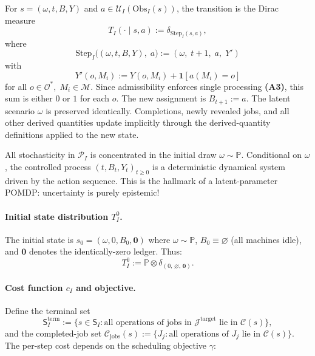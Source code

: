 For $s = (\omega, t, B, Y)$ and $a \in \mathcal{U}_I(\mathrm{Obs}_I(s))$, the transition
is the Dirac measure
\[
T_I(\cdot \mid s, a) := \delta_{\mathrm{Step}_I(s, a)},
\]
where
\[
\mathrm{Step}_I\bigl((\omega, t, B, Y),\; a\bigr) := (\omega,\; t+1,\; a,\; Y')
\]
with
\[
Y'(o, M_i) := Y(o, M_i) + \mathbf{1}[a(M_i) = o]
\]
for all $o \in \mathcal{O}^*,\; M_i \in \mathcal{M}$. Since admissibility enforces single
processing \textbf{(A3)}, this sum is either $0$ or $1$ for each $o$. The new assignment
is $B_{t+1} := a$. The latent scenario $\omega$ is preserved identically. Completions,
newly revealed jobs, and all other derived quantities update implicitly through the
derived-quantity definitions applied to the new state.

\begin{remark}
All stochasticity in $\mathcal{P}_I$ is concentrated in the initial draw
$\omega \sim \mathbb{P}$. Conditional on $\omega$, the controlled process
$(t, B_t, Y_t)_{t \ge 0}$ is a deterministic dynamical system driven by the action
sequence. This is the hallmark of a latent-parameter POMDP: uncertainty is purely
epistemic!
\end{remark}

\paragraph{Initial state distribution $T_I^0$.}

The initial state is $s_0 = (\omega, 0, B_0, \mathbf{0})$ where
$\omega \sim \mathbb{P}$, $B_0 \equiv \varnothing$ (all machines idle), and $\mathbf{0}$
denotes the identically-zero ledger. Thus:
\[
T_I^0 := \mathbb{P} \otimes \delta_{(0,\, \varnothing,\, \mathbf{0})}.
\]

\paragraph{Cost function $c_I$ and objective.}

Define the terminal set
\[
\mathsf{S}_I^{\mathrm{term}} := \{s \in \mathsf{S}_I : \text{all operations of jobs in }
\mathcal{J}^{\mathrm{target}} \text{ lie in } \mathcal{C}(s)\},
\]
and the completed-job set
$\mathcal{C}_{\mathrm{jobs}}(s) := \{J_j : \text{all operations of } J_j \text{ lie in }
\mathcal{C}(s)\}$. The per-step cost depends on the scheduling objective $\gamma$:

